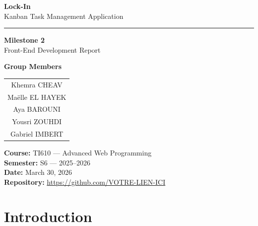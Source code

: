 \documentclass[12pt, a4paper]{article}
\begin{document}
\begin{titlepage}
\begin{center}

\vspace*{2cm}

{\Huge\bfseries\color{darkslate} Lock-In}\\[0.5cm]
{\Large\color{accentblue} Kanban Task Management Application}

\vspace{1.5cm}

\textcolor{accentblue}{\rule{0.6\textwidth}{2pt}}

\vspace{1.5cm}

{\LARGE\bfseries Milestone 2}\\[0.3cm]
{\Large Front-End Development Report}

\vspace{2cm}

{\large\bfseries Group Members}\\[0.6cm]
\begin{tabular}{c}
    \large Khemra CHEAV \\[0.3cm]
    \large Ma\"elle EL HAYEK \\[0.3cm]
    \large Aya BAROUNI \\[0.3cm]
    \large Yousri ZOUHDI \\[0.3cm]
    \large Gabriel IMBERT \\
\end{tabular}

\vfill

{\large\bfseries Course:} TI610 --- Advanced Web Programming\\[0.2cm]
{\large\bfseries Semester:} S6 --- 2025--2026\\[0.2cm]
{\large\bfseries Date:} March 30, 2026\\[0.2cm]
{\large\bfseries Repository:} \url{https://github.com/VOTRE-LIEN-ICI}

\vspace{1cm}

\end{center}
\end{titlepage}

\newpage
\tableofcontents
\newpage

\section{Introduction}
\end{document}
